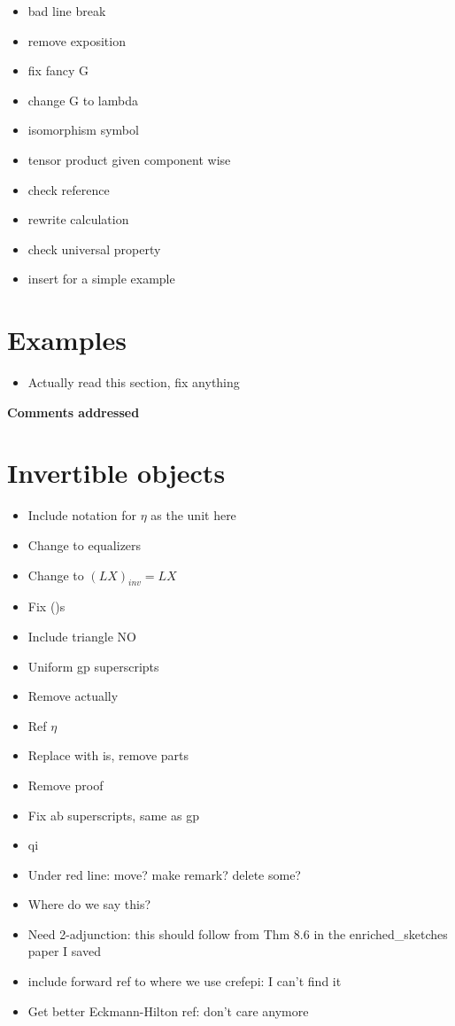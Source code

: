 \documentclass{amsart}
\begin{document}
\begin{itemize}
\item bad line break
\item remove exposition
\item fix fancy G
\item change G to lambda
\item isomorphism symbol
\item tensor product given component wise
\item check reference
\item rewrite calculation
\item check universal property
\item insert for a simple example
\end{itemize}



\section{ Examples}

\begin{itemize}
\item Actually read this section, fix anything
\end{itemize}
\newpage

\begin{center}
\begin{Large}
\textbf{Comments addressed}
\end{Large}
\end{center}
\vskip1cm


\section{ Invertible objects}
\begin{itemize}
\item Include notation for $\eta$ as the unit here
\item Change to equalizers
\item Change to $(LX)_{inv} = LX$
\item Fix ()s
\item Include triangle NO
\item Uniform gp superscripts
\item Remove actually
\item Ref $\eta$
\item Replace with is, remove parts
\item Remove proof
\item Fix ab superscripts, same as gp
\item qi
\item Under red line: move? make remark? delete some?
\item Where do we say this?
\item Need 2-adjunction: this should follow from Thm 8.6 in the enriched\_sketches paper I saved
\item include forward ref to where we use cref{epi}: I can't find it
\item Get better Eckmann-Hilton ref: don't care anymore
\end{itemize}
\end{document}
